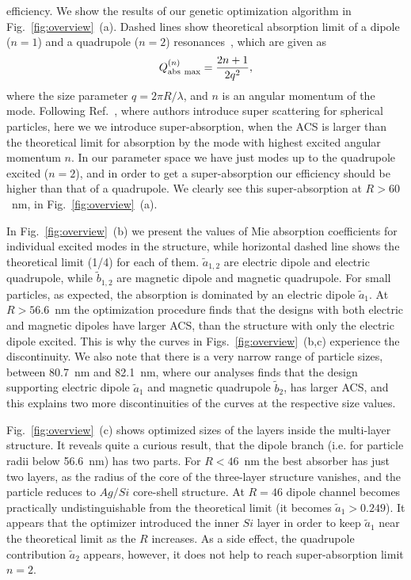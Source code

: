 \documentclass[aps,prl,twocolumn,showpacs,superscriptaddress,groupedaddress]{revtex4-1}
\begin{document}
efficiency.  We show the results of our genetic optimization algorithm
in Fig.~\ref{fig:overview}~(a).  Dashed lines show theoretical absorption
limit of a dipole ($n=1$) and a quadrupole ($n=2$)
resonances~\cite{Tribelsky-2011}, which are given as $$Q^{(n)}_{\rm
  abs\ max}=\frac{2n+1}{2q^2},$$ where the size parameter $q=2\pi
R/\lambda$, and $n$ is an angular momentum of the mode. Following
Ref.~\cite{Fan-2011}, where authors introduce super scattering for
spherical particles, here we we introduce super-absorption, when the
ACS is larger than the theoretical limit for absorption by the mode
with highest excited angular momentum $n$. In our parameter space we
have just modes up to the quadrupole excited ($n=2$), and in order to
get a super-absorption our efficiency should be higher than that of a
quadrupole. We clearly see this super-absorption at $R>60$~nm, in
Fig.~\ref{fig:overview}~(a).

In Fig.~\ref{fig:overview}~(b) we present the values of Mie absorption
coefficients for individual excited modes in the structure, while
horizontal dashed line shows the theoretical limit (1/4) for each of
them. $\tilde{a}_{1,2}$ are electric dipole and electric quadrupole,
while $\tilde{b}_{1,2}$ are magnetic dipole and magnetic
quadrupole. For small particles, as expected, the absorption is
dominated by an electric dipole $\tilde{a}_1$.  At $R >
56.6$~nm the optimization procedure finds that the designs with both
electric and magnetic dipoles have larger ACS, than the structure with
only the electric dipole excited. This is why the curves in
Figs.~\ref{fig:overview}~(b,c) experience the discontinuity. We also
note that there is a very narrow range of particle sizes, between
80.7~nm and 82.1~nm, where our analyses finds that the design
supporting electric dipole $\tilde{a}_1$ and magnetic quadrupole
$\tilde{b}_2$, has larger ACS, and this explains two more
discontinuities of the curves at the respective size values.

Fig.~\ref{fig:overview}~(c) shows optimized sizes of the layers inside
the multi-layer structure. It reveals quite a curious result, that the
dipole branch (i.e. for particle radii below 56.6~nm) has two
parts. For $R<46$~nm the best absorber has just two
layers, as the radius of the core of the three-layer structure
vanishes, and the particle reduces to $Ag/Si$ core-shell structure.
At $R=46$ dipole channel becomes practically
undistinguishable from the theoretical limit (it becomes
$\tilde{a}_1>0.249$).  It appears that the optimizer introduced the
inner $Si$ layer in order to keep $\tilde{a}_1$ near the theoretical
limit as the $R$ increases.  As a side effect, the
quadrupole contribution $\tilde{a}_2$ appears, however, it does not
help to reach super-absorption limit $n=2$.
\end{document}
